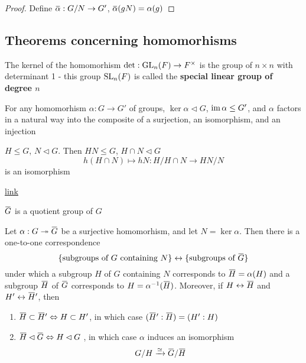 \documentclass[11pt]{article}
\begin{document}
\begin{proof}
Define \(\baralpha:G/N\to G'\), \(\baralpha(gN)=\alpha(g)\)
\end{proof}
\subsection{Theorems concerning homomorhisms}
\label{sec:org562712f}
The kernel of the homomorhism \(\det:\operatorname{GL}_n(F)\to F^{\times}\) is the group of \(n\times n\) with determinant
1 - this group \(\operatorname{SL}_n(F)\) is called the \textbf{special linear group of degree \(n\)}

\begin{theorem}
For any homomorhism \(\alpha:G\to G'\) of groups, \(\ker\alpha\lhd G\), \(\operatorname{im}\alpha\le G'\), and \(\alpha\) factors in a
natural way into the composite of a surjection, an isomorphism, and an injection
\begin{center}\end{center}
\end{theorem}

\begin{theorem}
\(H\le G\), \(N\lhd G\). Then \(HN\le G\), \(H\cap N\lhd G\)
\begin{equation*}
h(H\cap N)\mapsto hN:H/H\cap N\to HN/ N
\end{equation*}
is an isomorphism
\end{theorem}

\href{https://math.stackexchange.com/questions/3122468/is-hn-n-equal-to-h-n}{link}

\(\barG\) is a quotient group of \(G\)
\begin{theorem}
Let \(\alpha:G\twoheadrightarrow\barG\) be a surjective homomorhism, and let \(N=\ker\alpha\). Then there is a one-to-one
correspondence
\begin{equation*}
\{\text{subgroups of $G$ containing $N$}\}\leftrightarrow\{\text{subgroups of $\barG$}\}
\end{equation*}
under which a subgroup \(H\) of \(G\) containing \(N\) corresponds to \(\barH=\alpha(H)\) and a
subgroup \(\barH\) of \(\barG\) corresponds to \(H=\alpha^{-1}(\barH)\). Moreover, if \(H\leftrightarrow\barH\)
and \(H'\leftrightarrow\barH'\), then
\begin{enumerate}
\item \(\barH\subset\barH'\Leftrightarrow H\subset H'\), in which case \((\barH':\barH)=(H':H)\)
\item \(\barH\lhd\barG\Leftrightarrow H\lhd G\) , in which case \(\alpha\) induces an isomorphism
\begin{equation*}
G/H\xrightarrow{\simeq}\barG/\barH
\end{equation*}
\end{enumerate}
\end{theorem}
\end{document}
